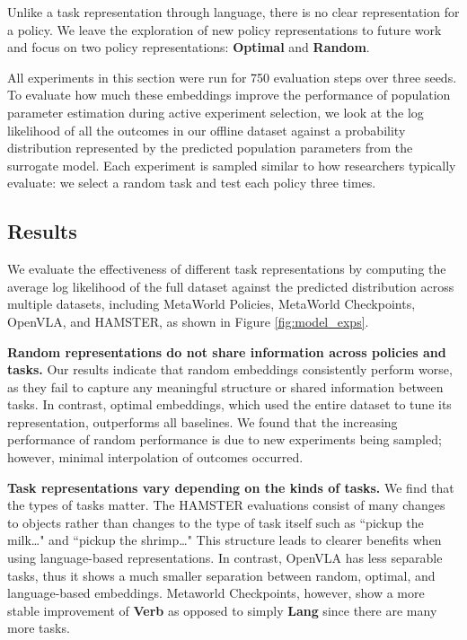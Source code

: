 Unlike a task representation through language, there is no clear representation for a policy. 
We leave the exploration of new policy representations to future work and focus on two policy representations: \textbf{Optimal} and \textbf{Random}.

All experiments in this section were run for 750 evaluation steps over three seeds.
To evaluate how much these embeddings improve the performance of population parameter estimation during active experiment selection, we look at the log likelihood of all the outcomes in our offline dataset against a probability distribution represented by the predicted population parameters from the surrogate model.
Each experiment is sampled similar to how researchers typically evaluate: we select a random task and test each policy three times.


\subsection{Results}

We evaluate the effectiveness of different task representations by computing the average log likelihood of the full dataset against the predicted distribution across multiple datasets, including MetaWorld Policies, MetaWorld Checkpoints, OpenVLA, and HAMSTER, as shown in Figure \ref{fig:model_exps}.


\textbf{Random representations do not share information across policies and tasks.}
Our results indicate that random embeddings consistently perform worse, as they fail to capture any meaningful structure or shared information between tasks. 
In contrast, optimal embeddings, which used the entire dataset to tune its representation, outperforms all baselines. 
We found that the increasing performance of random performance is due to new experiments being sampled; however, minimal interpolation of outcomes occurred.

\textbf{Task representations vary depending on the kinds of tasks.}
We find that the types of tasks matter. 
The HAMSTER evaluations consist of many changes to objects rather than changes to the type of task itself such as ``pickup the milk\dots" and ``pickup the shrimp\dots"
This structure leads to clearer benefits when using language-based representations.
In contrast, OpenVLA has less separable tasks, thus it shows a much smaller separation between random, optimal, and language-based embeddings.
Metaworld Checkpoints, however, show a more stable improvement of \textbf{Verb} as opposed to simply \textbf{Lang} since there are many more tasks.



